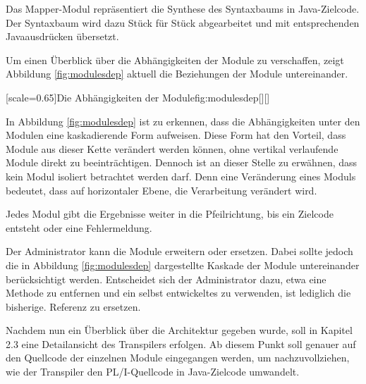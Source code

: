 Das Mapper-Modul repräsentiert die Synthese des Syntaxbaums in Java-Zielcode. Der Syntaxbaum wird dazu Stück für Stück abgearbeitet und mit entsprechenden Javaausdrücken übersetzt.

Um einen Überblick über die Abhängigkeiten der Module zu verschaffen, zeigt
Abbildung \ref{fig:modulesdep} aktuell die Beziehungen der Module untereinander.

[scale=0.65]{Die Abhängigkeiten der Module}{fig:modulesdep}[][]
\pagebreak

In Abbildung \ref{fig:modulesdep} ist zu erkennen, dass die Abhängigkeiten unter den Modulen eine kaskadierende Form aufweisen.
Diese Form hat den Vorteil, dass Module aus dieser Kette verändert werden können, ohne vertikal verlaufende Module direkt zu beeinträchtigen.
Dennoch ist an dieser Stelle zu erwähnen, dass kein Modul isoliert betrachtet werden darf. Denn eine Veränderung eines Moduls bedeutet, dass auf horizontaler 
Ebene, die Verarbeitung verändert wird.

Jedes Modul gibt die Ergebnisse weiter in die Pfeilrichtung, bis ein Zielcode entsteht oder eine Fehlermeldung.

Der Administrator kann die Module erweitern oder ersetzen.
Dabei sollte jedoch die in Abbildung \ref{fig:modulesdep} dargestellte Kaskade der Module untereinander berücksichtigt werden.
Entscheidet sich der Administrator dazu, etwa eine Methode zu entfernen und ein selbst entwickeltes zu verwenden, ist lediglich die bisherige. 
Referenz zu ersetzen.

Nachdem nun ein Überblick über die Architektur gegeben wurde, soll in Kapitel 2.3 eine Detailansicht des Transpilers erfolgen.
Ab diesem Punkt soll genauer auf den Quellcode der einzelnen Module eingegangen werden, um nachzuvollziehen, wie der Transpiler den PL/I-Quellcode in Java-Zielcode umwandelt.

